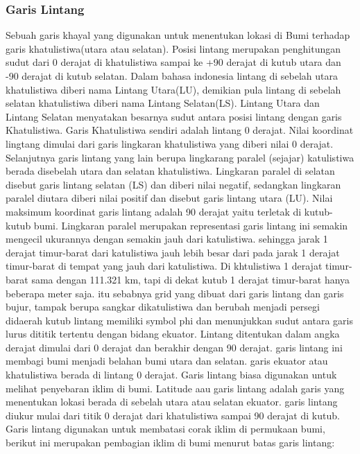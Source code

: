 \subsubsection{Garis Lintang}
Sebuah garis khayal yang digunakan untuk menentukan lokasi di Bumi terhadap garis khatulistiwa(utara atau selatan). Posisi lintang merupakan penghitungan sudut dari 0 derajat di khatulistiwa sampai ke +90 derajat di kutub utara dan -90 derajat di kutub selatan. Dalam bahasa indonesia lintang di sebelah utara khatulistiwa diberi nama Lintang Utara(LU), demikian pula lintang di sebelah selatan khatulistiwa diberi nama Lintang Selatan(LS). Lintang Utara dan Lintang Selatan menyatakan besarnya sudut antara posisi lintang dengan garis Khatulistiwa. Garis Khatulistiwa sendiri adalah lintang 0 derajat. 
Nilai koordinat lingtang dimulai dari garis lingkaran khatulistiwa yang diberi nilai 0 derajat. Selanjutnya garis lintang yang lain berupa lingkarang paralel (sejajar) katulistiwa berada disebelah utara dan selatan khatulistiwa. Lingkaran paralel di selatan disebut garis lintang selatan (LS) dan diberi nilai negatif, sedangkan lingkaran paralel diutara diberi nilai positif dan disebut garis lintang utara (LU). Nilai maksimum koordinat garis lintang adalah 90 derajat yaitu terletak di kutub-kutub bumi. 
Lingkaran paralel merupakan representasi garis lintang ini semakin mengecil ukurannya dengan semakin jauh dari katulistiwa. sehingga jarak 1 derajat timur-barat dari katulistiwa jauh lebih besar dari pada jarak 1 derajat timur-barat di tempat yang jauh dari katulistiwa. Di khtulistiwa 1 derajat timur-barat sama dengan 111.321 km, tapi di dekat kutub 1 derajat timur-barat hanya beberapa meter saja. itu sebabnya grid yang dibuat dari garis lintang dan garis bujur, tampak berupa sangkar dikatulistiwa dan berubah menjadi persegi didaerah kutub
lintang memiliki symbol phi dan menunjukkan sudut antara garis lurus dititik tertentu dengan bidang ekuator. Lintang ditentukan dalam angka derajat dimulai dari 0 derajat dan berakhir dengan 90 derajat. garis lintang ini membagi bumi menjadi belahan bumi utara dan selatan. garis ekuator atau khatulistiwa berada di lintang 0 derajat. Garis lintang biasa digunakan untuk melihat penyebaran iklim di bumi.
Latitude aau garis lintang adalah garis yang menentukan lokasi berada di sebelah utara atau selatan ekuator. garis lintang diukur mulai dari titik 0 derajat dari khatulistiwa sampai 90 derajat di kutub. Garis lintang digunakan untuk membatasi corak iklim di permukaan bumi, berikut ini merupakan pembagian iklim di bumi menurut batas garis lintang:
